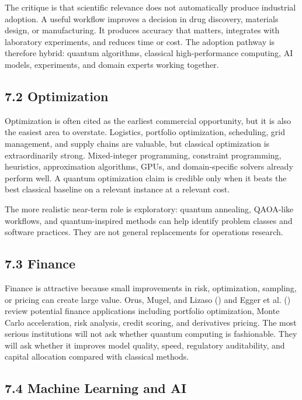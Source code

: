 \documentclass[
  11pt,
  letterpaper,
]{article}
\begin{document}
The critique is that scientific relevance does not automatically produce
industrial adoption. A useful workflow improves a decision in drug
discovery, materials design, or manufacturing. It produces accuracy that
matters, integrates with laboratory experiments, and reduces time or
cost. The adoption pathway is therefore hybrid: quantum algorithms,
classical high-performance computing, AI models, experiments, and domain
experts working together.

\subsection{7.2 Optimization}\label{optimization}

Optimization is often cited as the earliest commercial opportunity, but
it is also the easiest area to overstate. Logistics, portfolio
optimization, scheduling, grid management, and supply chains are
valuable, but classical optimization is extraordinarily strong.
Mixed-integer programming, constraint programming, heuristics,
approximation algorithms, GPUs, and domain-specific solvers already
perform well. A quantum optimization claim is credible only when it
beats the best classical baseline on a relevant instance at a relevant
cost.

The more realistic near-term role is exploratory: quantum annealing,
QAOA-like workflows, and quantum-inspired methods can help identify
problem classes and software practices. They are not general
replacements for operations research.

\subsection{7.3 Finance}\label{finance}

Finance is attractive because small improvements in risk, optimization,
sampling, or pricing can create large value. Orus, Mugel, and Lizaso
() and Egger et al.
() review potential finance applications
including portfolio optimization, Monte Carlo acceleration, risk
analysis, credit scoring, and derivatives pricing. The most serious
institutions will not ask whether quantum computing is fashionable. They
will ask whether it improves model quality, speed, regulatory
auditability, and capital allocation compared with classical methods.

\subsection{7.4 Machine Learning and AI}\label{machine-learning-and-ai}
\end{document}
